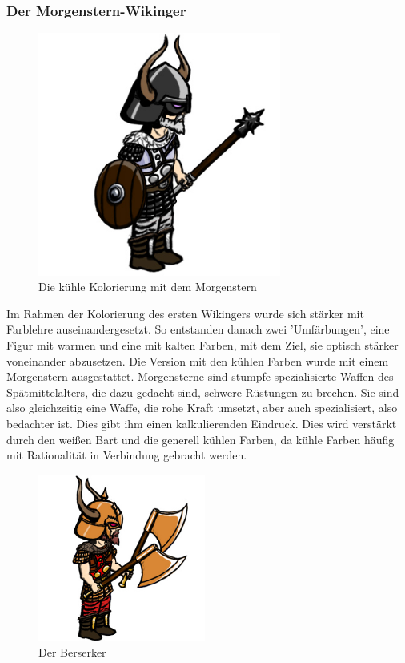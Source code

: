 \documentclass[extern,palatino]{cgBA}
\begin{document}
\newpage
\subsubsection{Der Morgenstern-Wikinger}
\begin{figure}[H]
	\centering
	\includegraphics[height=8cm]{morningstar.jpg}
	\caption{Die kühle Kolorierung mit dem Morgenstern}
	\label{morningstar}
\end{figure}
Im Rahmen der Kolorierung des ersten Wikingers wurde sich stärker mit Farblehre auseinandergesetzt. So entstanden danach zwei 'Umfärbungen', eine Figur mit warmen und eine mit kalten Farben, mit dem Ziel, sie optisch stärker voneinander abzusetzen. Die Version mit den kühlen Farben wurde mit einem Morgenstern ausgestattet. Morgensterne sind stumpfe spezialisierte Waffen des Spätmittelalters, die dazu gedacht sind, schwere Rüstungen zu brechen. Sie sind also gleichzeitig eine Waffe, die rohe Kraft umsetzt, aber auch spezialisiert, also bedachter ist. Dies gibt ihm einen kalkulierenden Eindruck. Dies wird verstärkt durch den weißen Bart und die generell kühlen Farben, da kühle Farben häufig mit Rationalität in Verbindung gebracht werden.
\newpage
\begin{figure}[H]
	\centering
	\includegraphics[height=5.5cm]{berserker.jpg}
	\caption{Der Berserker}
	\label{berserker} 
\end{figure}
\end{document}
